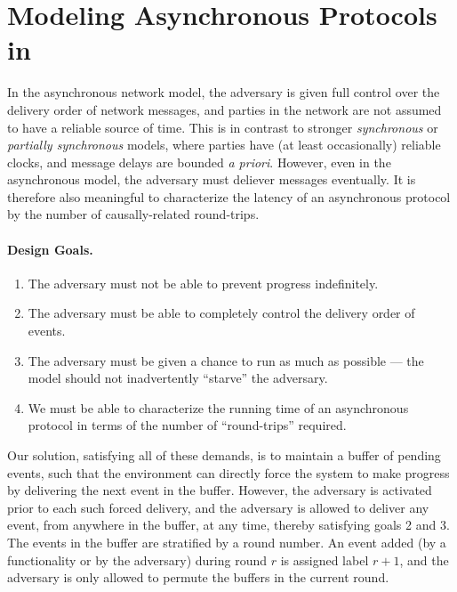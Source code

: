 \section{Modeling Asynchronous Protocols in \SaUCy}



In the asynchronous network model, the adversary is given full control over the delivery order of network messages, and parties in the network are not assumed to have a reliable source of time. This is in contrast to stronger \emph{synchronous} or \emph{partially synchronous} models, where parties have (at least occasionally) reliable clocks, and message delays are bounded \emph{a priori}.
However, even in the asynchronous model, the adversary must deliever messages eventually. It is therefore also meaningful to characterize the latency of an asynchronous protocol by the number of causally-related round-trips.



\paragraph{Design Goals.}

\begin{enumerate}
\item The adversary must not be able to prevent progress indefinitely.
\item The adversary must be able to completely control the delivery order of events.
\item The adversary must be given a chance to run as much as possible --- the model should not inadvertently ``starve'' the adversary.
\item We must be able to characterize the running time of an asynchronous protocol in terms of the number of ``round-trips'' required.
\end{enumerate}

Our solution, satisfying all of these demands, is to maintain a buffer of pending events, such that the environment can directly force the system to make progress by delivering the next event in the buffer.
However, the adversary is activated prior to each such forced delivery, and the adversary is allowed to deliver any event, from anywhere in the buffer, at any time, thereby satisfying goals 2 and 3.
The events in the buffer are stratified by a round number. An event added (by a functionality or by the adversary) during round $r$ is assigned label $r+1$, and the adversary is only allowed to permute the buffers in the current round.



